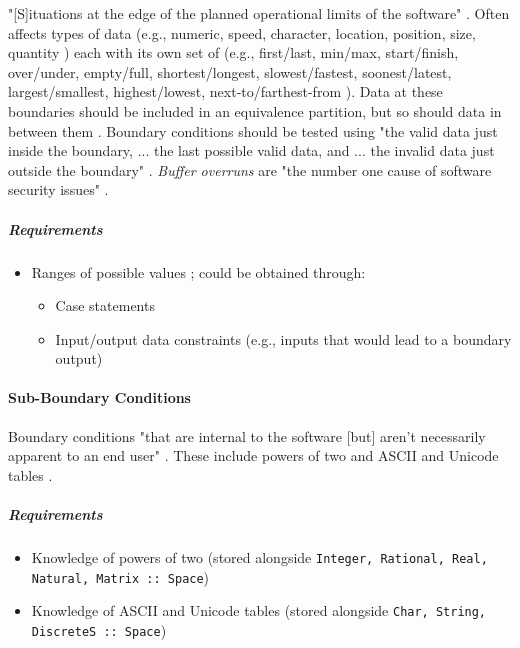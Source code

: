 "[S]ituations at the edge of the planned operational limits of the software"
\cite[p.~72]{patton_software_2006}. Often affects types of data (e.g., numeric,
speed, character, location, position, size, quantity
\cite[p.~72]{patton_software_2006}) each with its own set of (e.g., first/last,
min/max, start/finish, over/under, empty/full, shortest/longest,
slowest/fastest, soonest/latest, largest/smallest, highest/lowest,
next-to/farthest-from \cite[p.~72-73]{patton_software_2006}). Data at these
boundaries should be included in an equivalence partition, but so should
data in between them \cite[p.~73]{patton_software_2006}. Boundary conditions
should be tested using "the valid data just inside the boundary,
... the last possible valid data, and ... the invalid data just outside the
boundary" \cite[p.~73]{patton_software_2006}. \emph{Buffer overruns} are
"the number one cause of software security issues"
\cite[p.~75]{patton_software_2006}.


\subparagraph{Requirements}
\begin{itemize}
      \item Ranges of possible values \cite[p.~67, 73]{patton_software_2006};
            could be obtained through:
            \begin{itemize}
                  \item Case statements
                  \item Input/output data constraints (e.g., inputs that
                        would lead to a boundary output)
            \end{itemize}
\end{itemize}

\paragraph{Sub-Boundary Conditions \cite[p.~75-77]{patton_software_2006}}

Boundary conditions "that are internal to the software [but] aren't necessarily
apparent to an end user" \cite[p.~75]{patton_software_2006}. These include
powers of two \cite[p.~75-76]{patton_software_2006} and ASCII and Unicode tables
\cite[p.~76-77]{patton_software_2006}.

\subparagraph{Requirements}
\begin{itemize}
      \item Knowledge of powers of two \cite[p.~75-76]{patton_software_2006}
            (stored alongside \texttt{Integer, Rational, Real, Natural, Matrix
                  ::~Space})
      \item Knowledge of ASCII and Unicode tables \cite[p.~76-77]{patton_software_2006}
            (stored alongside \texttt{Char, String, DiscreteS ::~Space})
\end{itemize}

